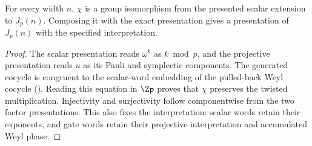 \begin{theorem}\label{thm:structural}
For every width $n$, $\chi$ is a group isomorphism from the presented
scalar extension to $J_p(n)$. Composing it with the exact presentation
gives a presentation of $J_p(n)$ with the specified interpretation.
\end{theorem}
\begin{proof}
The scalar presentation reads $\omega^k$ as $k\bmod p$, and the
projective presentation reads $u$ as its Pauli and symplectic components.
The generated cocycle is congruent to the scalar-word embedding of the
pulled-back Weyl cocycle ().
Reading this equation in $\Zp$ proves that $\chi$ preserves the twisted
multiplication. Injectivity and surjectivity follow componentwise from
the two factor presentations. This also fixes the interpretation:
scalar words retain their exponents, and gate words retain their
projective interpretation and accumulated Weyl phase.
\end{proof}

\begingroup\renewcommand{\AgdaCodeStyle}{\footnotesize}
\begin{code}%
\>[0]\AgdaSpace{}%
\AgdaSymbol{:}\AgdaSpace{}%
\AgdaSpace{}%
\AgdaSpace{}%
\<%
\\
\>[0][@{}l@{\AgdaIndent{0}}]%
\>[2]\AgdaSymbol{(}\AgdaSpace{}%
\AgdaSymbol{)}\AgdaSpace{}%
\AgdaSpace{}%
\AgdaSymbol{(}\AgdaSpace{}%
\AgdaSymbol{)}\<%
\\
\>[0]\AgdaSpace{}%
\AgdaSymbol{=}\AgdaSpace{}%
\<%
\end{code}
\endgroup

